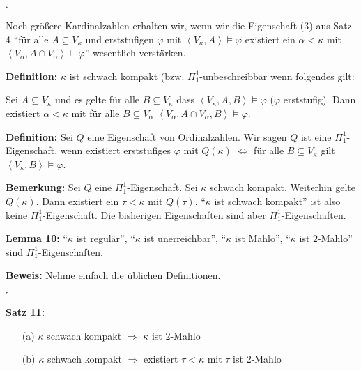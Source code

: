 \documentclass[a4paper,fontsize=11pt]{scrartcl}
\begin{document}
\hfill $\square$

Noch größere Kardinalzahlen erhalten wir, wenn wir die Eigenschaft (3)
aus Satz 4 ``für alle $A\subseteq V_\kappa$ und erststufigen $\varphi$
mit $\left<V_\kappa,A\right>\models\varphi$ existiert ein
$\alpha<\kappa$ mit $\left<V_\alpha,A\cap
V_\alpha\right>\models\varphi$'' wesentlich verstärken.

{\bf Definition:} $\kappa$ ist schwach kompakt
(bzw. $\Pi_1^1$-unbeschreibbar wenn folgendes gilt:

Sei $A\subseteq V_\kappa$ und es gelte für alle $B\subseteq V_\kappa$
dass $\left<V_\kappa, A, B\right>\models\varphi$ ($\varphi$
erststufig). Dann existiert $\alpha<\kappa$ mit für alle $B\subseteq
V_\alpha$ $\left<V_\alpha,A\cap V_\alpha,B\right>\models\varphi$.

{\bf Definition:} Sei $Q$ eine Eigenschaft von Ordinalzahlen. Wir
sagen $Q$ ist eine $\Pi_1^1$-Eigenschaft, wenn existiert erststufiges
$\varphi$ mit $Q(\kappa)$ $\Leftrightarrow$ für alle $B\subseteq
V_\kappa$ gilt $\left<V_\kappa,B\right>\models\varphi$.

{\bf Bemerkung:} Sei $Q$ eine $\Pi_1^1$-Eigenschaft. Sei $\kappa$
schwach kompakt. Weiterhin gelte $Q(\kappa)$. Dann existiert ein
$\tau<\kappa$ mit $Q(\tau)$. ``$\kappa$ ist schwach kompakt'' ist also
keine $\Pi_1^1$-Eigenschaft. Die bisherigen Eigenschaften sind aber
$\Pi_1^1$-Eigenschaften.

{\bf Lemma 10:} ``$\kappa$ ist regulär'', ``$\kappa$ ist
unerreichbar'', ``$\kappa$ ist Mahlo'', ``$\kappa$ ist $2$-Mahlo''
sind $\Pi_1^1$-Eigenschaften.

{\bf Beweis:} Nehme einfach die üblichen Definitionen.

\hfill $\square$

{\bf Satz 11:}
\begin{itemize}
\item[(a)] $\kappa$ schwach kompakt $\Rightarrow$ $\kappa$ ist
  $2$-Mahlo
\item[(b)] $\kappa$ schwach kompakt $\Rightarrow$ existiert
  $\tau<\kappa$ mit $\tau$ ist $2$-Mahlo
\end{itemize}
\end{document}

